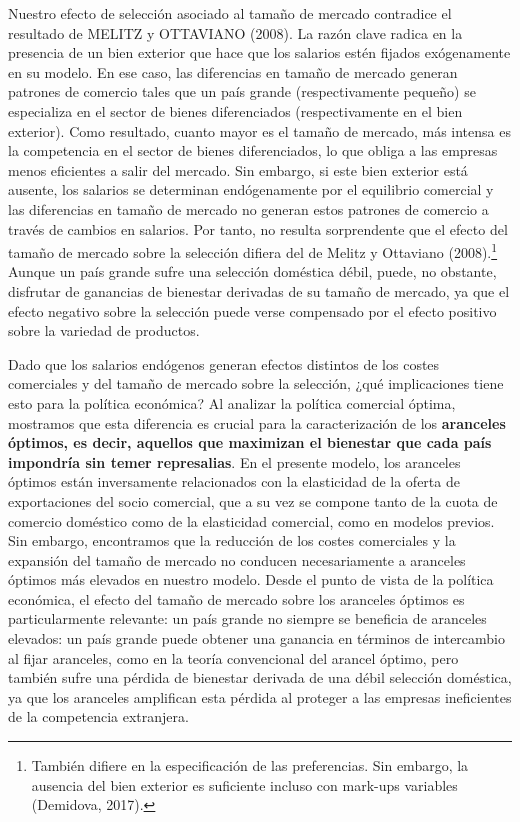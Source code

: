 \documentclass[10pt,a4paper]{article}
\begin{document}
Nuestro efecto de selección asociado al tamaño de mercado contradice el resultado de MELITZ y OTTAVIANO (2008). La razón clave radica en la presencia de un bien exterior que hace que los salarios estén fijados exógenamente en su modelo. En ese caso, las diferencias en tamaño de mercado generan patrones de comercio tales que un país grande (respectivamente pequeño) se especializa en el sector de bienes diferenciados (respectivamente en el bien exterior). Como resultado, cuanto mayor es el tamaño de mercado, más intensa es la competencia en el sector de bienes diferenciados, lo que obliga a las empresas menos eficientes a salir del mercado. Sin embargo, si este bien exterior está ausente, los salarios se determinan endógenamente por el equilibrio comercial y las diferencias en tamaño de mercado no generan estos patrones de comercio a través de cambios en salarios. Por tanto, no resulta sorprendente que el efecto del tamaño de mercado sobre la selección difiera del de Melitz y Ottaviano (2008).\footnote{%
    También difiere en la especificación de las preferencias. Sin embargo, la ausencia del bien exterior es suficiente incluso con mark-ups variables (Demidova, 2017).
} Aunque un país grande sufre una selección doméstica débil, puede, no obstante, disfrutar de ganancias de bienestar derivadas de su tamaño de mercado, ya que el efecto negativo sobre la selección puede verse compensado por el efecto positivo sobre la variedad de productos.

Dado que los salarios endógenos generan efectos distintos de los costes comerciales y del tamaño de mercado sobre la selección, ¿qué implicaciones tiene esto para la política económica? Al analizar la política comercial óptima, mostramos que esta diferencia es crucial para la caracterización de los \textbf{aranceles óptimos, es decir, aquellos que maximizan el bienestar que cada país impondría sin temer represalias}. En el presente modelo, los aranceles óptimos están inversamente relacionados con la elasticidad de la oferta de exportaciones del socio comercial, que a su vez se compone tanto de la cuota de comercio doméstico como de la elasticidad comercial, como en modelos previos. Sin embargo, encontramos que la reducción de los costes comerciales y la expansión del tamaño de mercado no conducen necesariamente a aranceles óptimos más elevados en nuestro modelo. Desde el punto de vista de la política económica, el efecto del tamaño de mercado sobre los aranceles óptimos es particularmente relevante: un país grande no siempre se beneficia de aranceles elevados: un país grande puede obtener una ganancia en términos de intercambio al fijar aranceles, como en la teoría convencional del arancel óptimo, pero también sufre una pérdida de bienestar derivada de una débil selección doméstica, ya que los aranceles amplifican esta pérdida al proteger a las empresas ineficientes de la competencia extranjera. 
\end{document}
